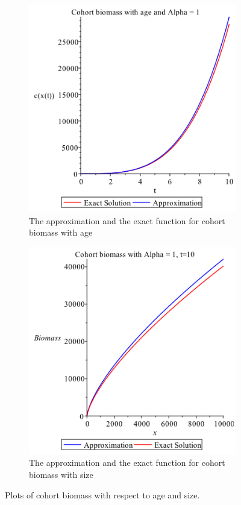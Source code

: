\documentclass{article}
\numberwithin{equation}{section} %
\begin{document}
\begin{figure}
\begin{subfigure}{0.5\textwidth}
\includegraphics[width=0.9\linewidth]{exercises/ex2_Approx-vs-Exact-age} 
\caption{The approximation and the exact function for cohort biomass with age}

\end{subfigure}
\begin{subfigure}{0.5\textwidth}
\centering
\includegraphics[width=0.9\linewidth]{exercises/ex2_Approx-vs-Exact-Size}
\caption{The approximation and the exact function for cohort biomass with size}
\label{fig:ex2age}
\end{subfigure}
\caption{Plots of cohort biomass with respect to age and size.} 
\label{fig:ex2}
\end{figure}
\newpage
\end{document}
